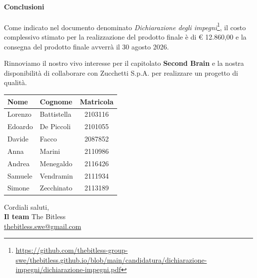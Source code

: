 \documentclass[a4paper, 10pt, colorlinks=true, linkcolor=black, urlcolor=blue, citecolor=blue, hidelinks]{article}
\begin{document}
\paragraph{Conclusioni}
Come indicato nel documento denominato \textit{Dichiarazione degli impegni}\footnote{\url{https://github.com/thebitless-group-swe/thebitless.github.io/blob/main/candidatura/dichiarazione-impegni/dichiarazione-impegni.pdf}}, il costo complessivo stimato per la realizzazione del prodotto finale è di € 12.860,00 e la consegna del prodotto finale avverrà il 30 agosto 2026.

\noindent Rinnoviamo il nostro vivo interesse per il capitolato \textbf{Second Brain} e la nostra disponibilità di collaborare con Zucchetti S.p.A. per realizzare un progetto di qualità. \\

\begin{center}
    \begin{tabular}{|l|l|c|}
        \hline
        \textbf{Nome} & \textbf{Cognome} & \textbf{Matricola} \\
        \hline
        Lorenzo & Battistella & 2103116 \\
        Edoardo & De Piccoli &  2101055 \\
        Davide & Facco &        2087852 \\
        Anna & Marini &         2110986\\
        Andrea & Menegaldo &    2116426 \\
        Samuele & Vendramin &   2111934 \\
        Simone & Zecchinato &   2113189 \\
        \hline
    \end{tabular}
\end{center}

\vspace{1cm}

\hfill
\begin{minipage}{0.4\textwidth}
    \centering
    Cordiali saluti, \\
    \textbf{Il team} The Bitless\\
    \href{mailto:thebitless.swe@gmail.com}{thebitless.swe@gmail.com}
\end{minipage}
\end{document}
